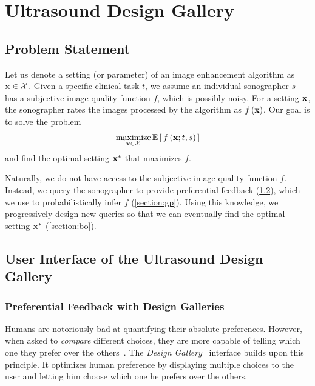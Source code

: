 
\section{Ultrasound Design Gallery}\label{section:usdg}


\subsection{Problem Statement}
Let us denote a setting (or parameter) of an image enhancement algorithm as \(\mathbf{x} \in \mathcal{X}\).
Given a specific clinical task \(t\), we assume an individual sonographer \(s\) has a subjective image quality function \(f\), which is possibly noisy.
For a setting \(\mathbf{x}\), the sonographer rates the images processed by the algorithm as \(f\left(\mathbf{x}\right)\).
Our goal is to solve the problem
%
\begin{align}
  \operatorname*{maximize}_{\mathbf{x} \in \mathcal{X}} \mathbb{E}\left[\,f\left(\mathbf{x}; t, s \right)\,\right]
\end{align}
%
and find the optimal setting \(\mathbf{x}^*\) that maximizes \(f\).

Naturally, we do not have access to the subjective image quality function \(f\).
Instead, we query the sonographer to provide preferential feedback (\cref{section:ui}), which we use to probabilistically infer \(f\) (\cref{section:gp}).
Using this knowledge, we progressively design new queries so that we can eventually find the optimal setting \(\mathbf{x}^*\) (\cref{section:bo}).

\subsection{User Interface of the Ultrasound Design Gallery}\label{section:ui}
\subsubsection{Preferential Feedback with Design Galleries}
Humans are notoriously bad at quantifying their absolute preferences.
However, when asked to \textit{compare} different choices, they are more capable of telling which one they prefer over the others~\cite{10.2307/27821441, NIPS2007_b6a1085a}.
The \textit{Design Gallery}~\cite{10.1145/258734.258887} interface builds upon this principle.
It optimizes human preference by displaying multiple choices to the user and letting him choose which one he prefers over the others.

